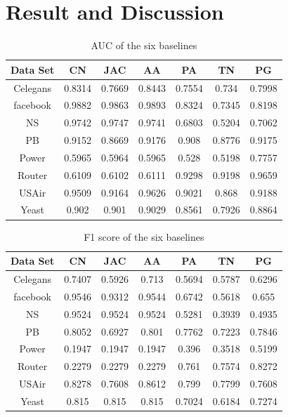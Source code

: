 \documentclass[12pt]{article}
\begin{document}
\section{Result and Discussion}
\begin{table}
	\begin{center}
		\begin{tabular}{|c|c|c|c|c|c|c|}
		\hline
		Data Set & CN & JAC & AA & PA  & TN & PG \\
		\hline
		Celegans&0.8314&0.7669&0.8443&0.7554&0.734&0.7998\\
		facebook&0.9882&0.9863&0.9893&0.8324&0.7345&0.8198\\
		NS&0.9742&0.9747&0.9741&0.6803&0.5204&0.7062\\
		PB&0.9152&0.8669&0.9176&0.908&0.8776&0.9175\\
		Power&0.5965&0.5964&0.5965&0.528&0.5198&0.7757\\
		Router&0.6109&0.6102&0.6111&0.9298&0.9198&0.9659\\
		USAir&0.9509&0.9164&0.9626&0.9021&0.868&0.9188\\
		Yeast&0.902&0.901&0.9029&0.8561&0.7926&0.8864\\
		\hline
		\end{tabular}
	\end{center}
	\caption{AUC of the six baselines}
	\label{tab:auc}
\end{table}

\begin{table}
	\begin{center}
		\begin{tabular}{|c|c|c|c|c|c|c|}
			\hline
			Data Set & CN & JAC & AA & PA & TN & PG \\
			\hline
			Celegans&0.7407&0.5926&0.713&0.5694&0.5787&0.6296\\
			facebook&0.9546&0.9312&0.9544&0.6742&0.5618&0.655\\
			NS&0.9524&0.9524&0.9524&0.5281&0.3939&0.4935\\
			PB&0.8052&0.6927&0.801&0.7762&0.7223&0.7846\\
			Power&0.1947&0.1947&0.1947&0.396&0.3518&0.5199\\
			Router&0.2279&0.2279&0.2279&0.761&0.7574&0.8272\\
			USAir&0.8278&0.7608&0.8612&0.799&0.7799&0.7608\\
			Yeast&0.815&0.815&0.815&0.7024&0.6184&0.7274\\
			\hline
		\end{tabular}
	\end{center}
	\caption{F1 score of the six baselines}
	\label{tab:f1}
\end{table}
\end{document}
